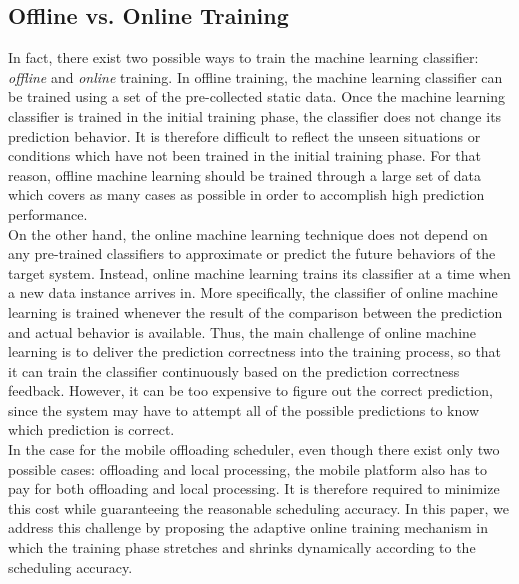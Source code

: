 \documentclass[10pt, conference, compsocconf]{IEEEtran}
\begin{document}
\subsection{Offline vs. Online Training}
%
%
In fact, there exist two possible ways to train the machine learning
classifier: \textit{offline} and \textit{online} training.
%
In offline training, the machine learning classifier can be trained
using a set of the pre-collected static data.
%
Once the machine learning classifier is trained in the initial training
phase, the classifier does not change its prediction behavior.
%
It is therefore difficult to reflect the unseen situations or conditions
which have not been trained in the initial training phase.
%
For that reason, offline machine learning should be trained through a
large set of data which covers as many cases as possible in order to
accomplish high prediction performance.\\
%
\indent On the other hand, the online machine learning technique does
not depend on any pre-trained classifiers to approximate or predict 
the future behaviors of the target system.
%
Instead, online machine learning trains its classifier at a time
when a new data instance arrives in.
%
More specifically, the classifier of online machine learning is trained
whenever the result of the comparison between the prediction and actual
behavior is available.
%
Thus, the main challenge of online machine learning is to deliver the
prediction correctness into the training process, so that it can train
the classifier continuously based on the prediction correctness feedback.
%
%
%
However, it can be too expensive to figure out the correct prediction,
since the system may have to attempt all of the possible predictions to
know which prediction is correct.\\ 
%
\indent In the case for the mobile offloading scheduler, even though
there exist only two possible cases: offloading and local processing,
the mobile platform also has to pay for both offloading and local
processing.  
%
It is therefore required to minimize this cost while guaranteeing the
reasonable scheduling accuracy.
%
In this paper, we address this challenge by proposing the adaptive
online training mechanism in which the training phase stretches and
shrinks dynamically according to the scheduling accuracy. 
%
\end{document}
